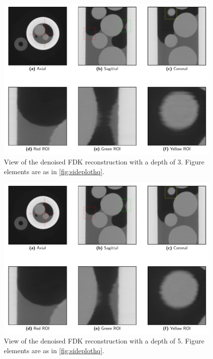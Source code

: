 \begin{figure}[htbp]
  \centering
  \includegraphics[width=.85\textwidth]{figures/kimrobertdepth3-x475y620s250.pdf}
  \caption[Depth=3]{View of the denoised FDK reconstruction with a depth of 3. Figure elements are as in \cref{fig:sideplothq}. }
  \label{fig:sideplotdepth3}
\end{figure}

\begin{figure}[htbp]
  \centering
  \includegraphics[width=.85\textwidth]{figures/kimrobertdepth5-x475y620s250.pdf}
  \caption[Depth=5]{View of the denoised FDK reconstruction with a depth of 5. Figure elements are as in \cref{fig:sideplothq}. }
  \label{fig:sideplotdepth5}
\end{figure}

